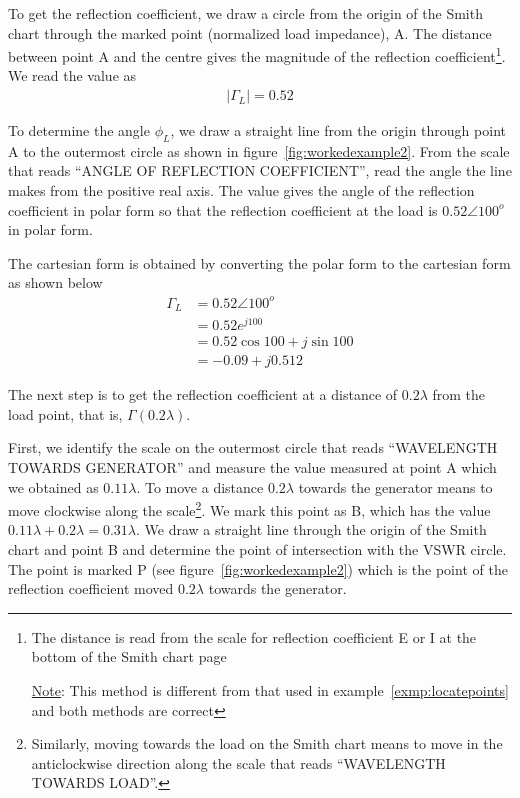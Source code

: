 \begin{exmp}
To get the reflection coefficient, we draw a circle from the origin of the Smith chart through the marked point (normalized load impedance), A. The distance between point A and the centre gives the magnitude of the reflection coefficient\footnote{
The distance is read from the scale for reflection coefficient E or I at the bottom of the Smith chart page

\underline{Note}: This method is different from that used in example~\ref{exmp:locatepoints} and both methods are correct
}. We read the value as
\begin{align*}
|\Gamma_{L}| = 0.52
\end{align*}

To determine the angle $\phi_{L}$, we draw a straight line from the origin through point A to the outermost circle as shown in figure~\ref{fig:workedexample2}. From the scale that reads \textquotedblleft ANGLE OF REFLECTION COEFFICIENT\textquotedblright\;, read the angle the line makes from the positive real axis. The value gives the angle of the reflection coefficient in polar form so that the reflection coefficient at the load is $0.52\angle100^o$ in polar form.

The cartesian form is obtained by converting the polar form to the cartesian form as shown below
\begin{align*}
\Gamma_{L} &= 0.52\angle100^o\\
&= 0.52e^{j100}\\
&= 0.52{\cos100 + j\sin100}\\
&= -0.09+j0.512
\end{align*}

The next step is to get the reflection coefficient at a distance of $0.2\lambda$ from the load point, that is, $\Gamma(0.2\lambda)$. 

First, we identify the scale on the outermost circle that reads \textquotedblleft WAVELENGTH TOWARDS GENERATOR\textquotedblright\; and measure the value measured at point A which we obtained as $0.11\lambda$. To move a distance $0.2\lambda$ towards the generator means to move clockwise along the scale\footnote{
Similarly, moving towards the load on the Smith chart means to move in the anticlockwise direction along the scale that reads \textquotedblleft WAVELENGTH TOWARDS LOAD\textquotedblright\;.
}. We mark this point as B, which has the value $0.11\lambda + 0.2\lambda=0.31\lambda$. We draw a straight line through the origin of the Smith chart and point B and determine the point of intersection with the VSWR circle. The point is marked P (see figure~\ref{fig:workedexample2}) which is the point of the reflection coefficient moved $0.2\lambda$ towards the generator. 


\end{exmp}

